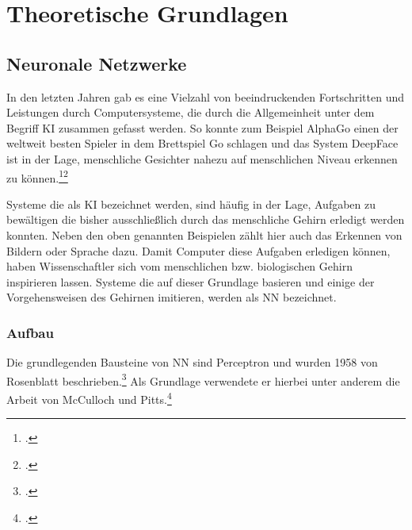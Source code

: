 \newpage
\section{Theoretische Grundlagen} \label{infos}

\subsection{Neuronale Netzwerke}
In den letzten Jahren gab es eine Vielzahl von beeindruckenden Fortschritten und Leistungen durch Computersysteme, die durch die Allgemeinheit unter dem Begriff \ac{KI} zusammen gefasst werden. So konnte zum Beispiel AlphaGo einen der weltweit besten Spieler in dem Brettspiel Go schlagen und das System DeepFace ist in der Lage, menschliche Gesichter nahezu auf menschlichen Niveau erkennen zu können.\footcites[Vgl.][]{spiegelGoogleComputerAlphaGo2016}\footcite[Vgl.][]{taigman2014deepface}

Systeme die als \ac{KI} bezeichnet werden, sind häufig in der Lage, Aufgaben zu bewältigen die bisher ausschließlich durch das menschliche Gehirn erledigt werden konnten. Neben den oben genannten Beispielen zählt hier auch das Erkennen von Bildern oder Sprache dazu. Damit Computer diese Aufgaben erledigen können, haben Wissenschaftler sich vom menschlichen bzw. biologischen Gehirn inspirieren lassen. Systeme die auf dieser Grundlage basieren und einige der Vorgehensweisen des Gehirnen imitieren, werden als \ac{NN} bezeichnet.

\subsubsection{Aufbau}
Die grundlegenden Bausteine von \ac{NN} sind Perceptron und wurden 1958 von Rosenblatt beschrieben.\footcite[Vgl.][]{rosenblattPerceptronProbabilisticModel1958} Als Grundlage verwendete er hierbei unter anderem die Arbeit von McCulloch und Pitts.\footcite[Vgl.][]{mccullochLogicalCalculusIdeas1943}


